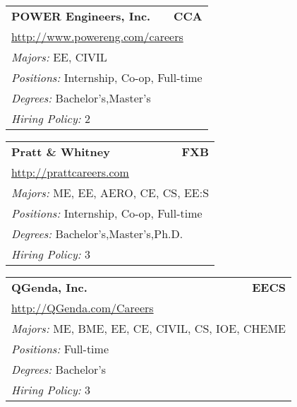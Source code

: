 \documentclass[twoside]{article}
\begin{document}
\begin{center}
\begin{multicols}{3}
\begin{FlushLeft}
\begin{minipage}{\columnwidth}
\end{minipage}
 
\begin{minipage}{\columnwidth}\begin{tabularx}{.95\columnwidth}{Xr}
                 {\Large\bf POWER Engineers, Inc.} & {\Large\bf CCA}\\
    \multicolumn{2}{p{.95\columnwidth}}{\url{http://www.powereng.com/careers}}\\
    \multicolumn{2}{p{.95\columnwidth}}{\emph{Majors:} EE, CIVIL}\\
    \multicolumn{2}{p{.95\columnwidth}}{\emph{Positions:} Internship, Co-op, Full-time}\\
    \multicolumn{2}{p{.95\columnwidth}}{\emph{Degrees:} Bachelor's,Master's}\\
    \multicolumn{2}{p{.95\columnwidth}}{\emph{Hiring Policy:} 2}\\
    \end{tabularx}
    
\end{minipage}
 
\begin{minipage}{\columnwidth}\begin{tabularx}{.95\columnwidth}{Xr}
                 {\Large\bf Pratt \& Whitney} & {\Large\bf FXB}\\
    \multicolumn{2}{p{.95\columnwidth}}{\url{http://prattcareers.com}}\\
    \multicolumn{2}{p{.95\columnwidth}}{\emph{Majors:} ME, EE, AERO, CE, CS, EE:S}\\
    \multicolumn{2}{p{.95\columnwidth}}{\emph{Positions:} Internship, Co-op, Full-time}\\
    \multicolumn{2}{p{.95\columnwidth}}{\emph{Degrees:} Bachelor's,Master's,Ph.D.}\\
    \multicolumn{2}{p{.95\columnwidth}}{\emph{Hiring Policy:} 3}\\
    \end{tabularx}
    
\end{minipage}
 
\begin{minipage}{\columnwidth}\begin{tabularx}{.95\columnwidth}{Xr}
                 {\Large\bf QGenda, Inc.} & {\Large\bf EECS}\\
    \multicolumn{2}{p{.95\columnwidth}}{\url{http://QGenda.com/Careers}}\\
    \multicolumn{2}{p{.95\columnwidth}}{\emph{Majors:} ME, BME, EE, CE, CIVIL, CS, IOE, CHEME}\\
    \multicolumn{2}{p{.95\columnwidth}}{\emph{Positions:} Full-time}\\
    \multicolumn{2}{p{.95\columnwidth}}{\emph{Degrees:} Bachelor's}\\
    \multicolumn{2}{p{.95\columnwidth}}{\emph{Hiring Policy:} 3}\\
    \end{tabularx}
    

\end{minipage}
\end{FlushLeft}
\end{multicols}
\end{center}
\end{document}
